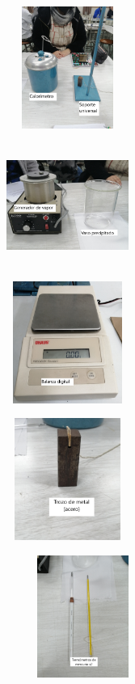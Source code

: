 \documentclass[a4paper, 12p]{article}
\begin{document}
\begin{figure}[H]
    \begin{subfigure}
          \raggedleft
          \includegraphics[width=4cm, height=4cm]{img/imag1.jpg}
    \end{subfigure}
    \begin{subfigure}
          \raggedleft
          \includegraphics[width=4cm, height=4cm]{img/imag2.jpg}
    \end{subfigure}
    \begin{subfigure}
          \raggedleft
          \includegraphics[width=4cm, height=4cm]{img/imag3.jpg}   
    \end{subfigure}   
    \begin{subfigure}
          \raggedleft
          \includegraphics[width=4cm, height=4cm]{img/imag4.jpg} 
    \end{subfigure}
    \begin{subfigure}
          \raggedleft
          \includegraphics[width=5cm, height=4cm]{img/imag5.jpg} 
    \end{subfigure}
\end{figure}     
\end{document}
